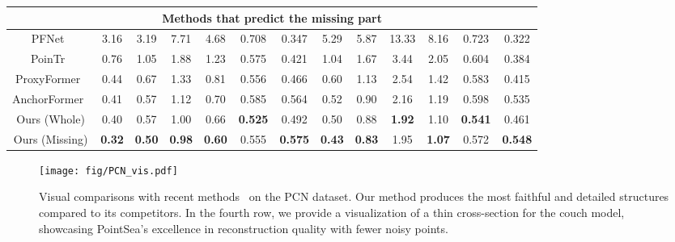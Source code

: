 \begin{table*}[htb]
\begin{tabular}{|c|cccccc|cccccc|}
    \hline
    \multicolumn{13}{|c|}{Methods that predict the missing part}\\
    \hline
    
    PFNet~\citep{huang2020pf} & 3.16 & 3.19 & 7.71 & 4.68 & 0.708 & 0.347 & 5.29 & 5.87 & 13.33 & 8.16 & 0.723 & 0.322\\
    PoinTr~\citep{yu2021pointr} & 0.76 & 1.05 & 1.88 & 1.23 & 0.575 & 0.421 & 1.04 & 1.67 & 3.44 & 2.05 & 0.604 & 0.384\\
    ProxyFormer~\citep{li2023proxyformer} & 0.44 & 0.67 & 1.33 & 0.81 & 0.556 & 0.466 & 0.60 & 1.13 & 2.54 & 1.42 & 0.583 & 0.415\\
    AnchorFormer~\citep{chen2023anchorformer} & 0.41 & 0.57 & 1.12 & 0.70 & 0.585 & 0.564 & 0.52 & 0.90 & 2.16 & 1.19 & 0.598 & 0.535\\
    
    \hline
    Ours (Whole) & 0.40  & 0.57 & 1.00  & 0.66 & \textbf{0.525} & 0.492 & 0.50 & 0.88 & \textbf{1.92} & 1.10 & \textbf{0.541} & 0.461\\
    Ours (Missing) & \textbf{0.32}  & \textbf{0.50} & \textbf{0.98}  & \textbf{0.60} & 0.555 & \textbf{0.575} &\textbf{0.43} & \textbf{0.83} & 1.95 & \textbf{1.07} & 0.572 & \textbf{0.548}\\
    \hline
    \end{tabular}
\end{table*}

\begin{figure*}[t]
  \centering
  \texttt{[image: fig/PCN\_vis.pdf]}
\caption{Visual comparisons with recent methods~\citep{9928787,zhou2022seedformer,chen2023anchorformer,10232862,Zhu_2023_ICCV} on the PCN dataset. Our method produces the most faithful and detailed structures compared to its competitors. In the fourth row, we provide a visualization of a thin cross-section for the couch model, showcasing PointSea's excellence in reconstruction quality with fewer noisy points. }
  \label{fig:Vis_PCN}
\end{figure*}

